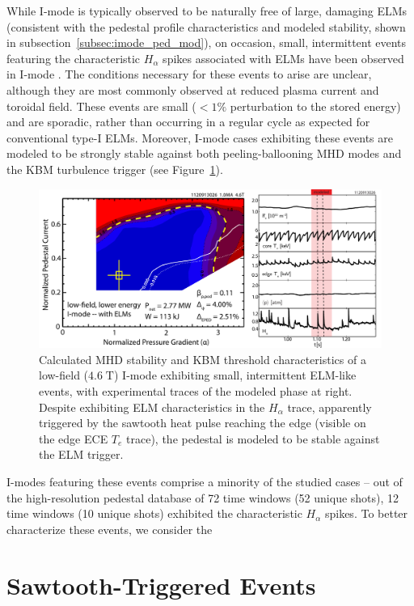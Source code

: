 \documentclass[12pt,floatfix,showpacs]{revtex4-1}
\begin{document}
While I-mode is typically observed to be naturally free of large, damaging ELMs (consistent with the pedestal profile characteristics and modeled stability, shown in subsection~\ref{subsec:imode_ped_mod}), on occasion, small, intermittent events featuring the characteristic $H_\alpha$ spikes associated with ELMs have been observed in I-mode \cite{Whyte2010,Walk2014}.  
The conditions necessary for these events to arise are unclear, although they are most commonly observed at reduced plasma current and toroidal field.  
These events are small ($<1\%$ perturbation to the stored energy) and are sporadic, rather than occurring in a regular cycle as expected for conventional type-I ELMs.  
Moreover, I-mode cases exhibiting these events are modeled to be strongly stable against both peeling-ballooning MHD modes and the KBM turbulence trigger (see Figure~\ref{fig:elite_1120913026}).

\begin{figure}[ht]
 \includegraphics[width=\textwidth]{pdfgraphics/1120913026_ELITE_stitch_v3.pdf}
 \caption{Calculated MHD stability and KBM threshold characteristics of a low-field ($4.6\;\mbox{T}$) I-mode exhibiting small, intermittent ELM-like events, with experimental traces of the modeled phase at right.  Despite exhibiting ELM characteristics in the $H_\alpha$ trace, apparently triggered by the sawtooth heat pulse reaching the edge (visible on the edge ECE $T_e$ trace), the pedestal is modeled to be stable against the ELM trigger.}
 \label{fig:elite_1120913026}
\end{figure}

I-modes featuring these events comprise a minority of the studied cases -- out of the high-resolution pedestal database of 72 time windows (52 unique shots), 12 time windows (10 unique shots) exhibited the characteristic $H_\alpha$ spikes.
To better characterize these events, we consider the 

\section{Sawtooth-Triggered Events}\label{sec:sawtooth}
\end{document}
